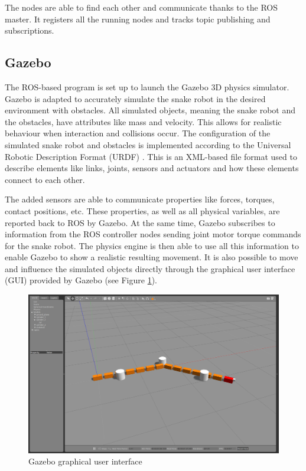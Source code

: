 The nodes are able to find each other and communicate thanks to the ROS master. It registers all the 
running nodes and tracks topic publishing and subscriptions.

\subsection{Gazebo}

The ROS-based program is set up to launch the Gazebo 3D physics simulator. Gazebo is adapted to accurately simulate the snake robot in the desired environment with obstacles. All simulated objects, meaning the snake robot and the obstacles, have attributes like mass and velocity. This allows for realistic behaviour when interaction and collisions occur. The configuration of the simulated snake robot and obstacles is implemented according to the Universal Robotic Description Format (URDF) \cite{urdfWeb}. This is an XML-based file format used to describe elements like links, joints, sensors and actuators and how these elements connect to each other.

The added sensors are able to communicate properties like forces, torques, contact positions, etc. These properties, as well as all physical variables, are reported back to ROS by Gazebo.
At the same time, Gazebo subscribes to information from the ROS controller nodes sending joint motor torque commands for the snake robot. The physics engine is then able to use all this information to enable Gazebo to show a realistic resulting movement. It is also possible to move and influence the simulated objects directly through the graphical user interface (GUI) provided by Gazebo (see Figure \ref{fig:gazebo_gui}).

\begin{figure}
    \centering
    \includegraphics[width=1\textwidth]{figures/simulator/gazebo_gen_screen.png}
    \caption{Gazebo graphical user interface}
    \label{fig:gazebo_gui}
\end{figure}